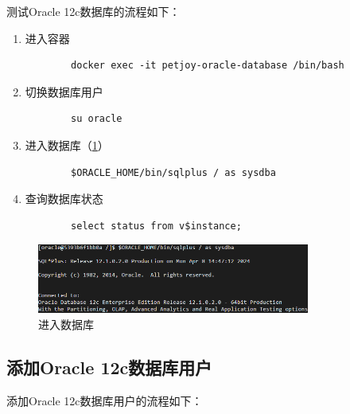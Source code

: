 测试Oracle 12c数据库的流程如下：

\begin{enumerate}
	\item 进入容器
	\begin{verbatim}
		docker exec -it petjoy-oracle-database /bin/bash
	\end{verbatim}
	\item 切换数据库用户
	\begin{verbatim}
		su oracle
	\end{verbatim}
	\item 进入数据库（\cref{fig:AccessToDatabase}）
	\begin{verbatim}
		$ORACLE_HOME/bin/sqlplus / as sysdba
	\end{verbatim}
	\item 查询数据库状态
	\begin{verbatim}
		select status from v$instance;
	\end{verbatim}
\end{enumerate}

\begin{figure}[htbp]
	\centering
	\includegraphics[width=0.8\textwidth]{figures/AccessToDatabase.png}
	\caption{进入数据库}
	\label{fig:AccessToDatabase}
\end{figure}

\subsection{添加Oracle 12c数据库用户}

添加Oracle 12c数据库用户的流程如下：


